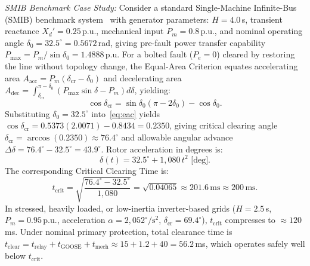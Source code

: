 \documentclass[journal]{IEEEtran}
\begin{document}
\textit{SMIB Benchmark Case Study:} Consider a standard Single-Machine Infinite-Bus (SMIB) benchmark system~\cite{kundur1994power} with generator parameters: $H = 4.0$\,s, transient reactance $X_d' = 0.25$\,p.u., mechanical input $P_m = 0.8$\,p.u., and nominal operating angle $\delta_0 = 32.5^\circ = 0.5672$\,rad, giving pre-fault power transfer capability $P_{\max} = P_m / \sin \delta_0 = 1.4888$\,p.u. For a bolted fault ($P_e = 0$) cleared by restoring the line without topology change, the Equal-Area Criterion equates accelerating area $A_{\text{acc}} = P_m(\delta_{\text{cr}} - \delta_0)$ and decelerating area $A_{\text{dec}} = \int_{\delta_{\text{cr}}}^{\pi - \delta_0} (P_{\max}\sin\delta - P_m)d\delta$, yielding:
\begin{equation}
\cos \delta_{\text{cr}} = \sin \delta_0 (\pi - 2\delta_0) - \cos \delta_0.
\label{eq:eac}
\end{equation}
Substituting $\delta_0 = 32.5^\circ$ into~\eqref{eq:eac} yields $\cos \delta_{\text{cr}} = 0.5373(2.0071) - 0.8434 = 0.2350$, giving critical clearing angle $\delta_{\text{cr}} = \arccos(0.2350) \approx 76.4^\circ$ and allowable angular advance $\Delta \delta = 76.4^\circ - 32.5^\circ = 43.9^\circ$. Rotor acceleration in degrees is:
\begin{equation}
\delta(t) = 32.5^\circ + 1{,}080\,t^2 \text{ [deg]}.
\end{equation}
The corresponding Critical Clearing Time is:
\begin{equation}
t_{\text{crit}} = \sqrt{\frac{76.4^\circ - 32.5^\circ}{1{,}080}} = \sqrt{0.04065} \approx 201.6\,\text{ms} \approx 200\,\text{ms}.
\end{equation}
In stressed, heavily loaded, or low-inertia inverter-based grids ($H = 2.5$\,s, $P_m = 0.95$\,p.u., acceleration $\alpha = 2{,}052^\circ/\text{s}^2$, $\delta_{\text{cr}} = 69.4^\circ$), $t_{\text{crit}}$ compresses to $\approx 120$\,ms.
Under nominal primary protection, total clearance time is $t_{\text{clear}} = t_{\text{relay}} + t_{\text{GOOSE}} + t_{\text{mech}} \approx 15 + 1.2 + 40 = 56.2$\,ms, which operates safely well below $t_{\text{crit}}$.
\end{document}

